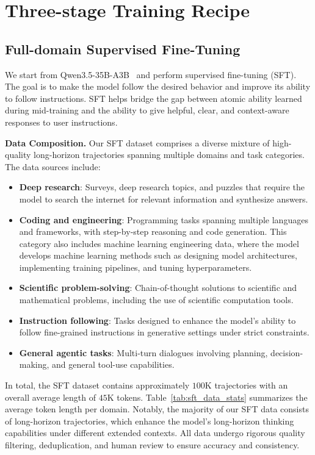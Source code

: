 \section{Three-stage Training Recipe}

\subsection{Full-domain Supervised Fine-Tuning}
\label{sec:sft}

We start from Qwen3.5-35B-A3B~\citep{Qwen3.5} and perform supervised fine-tuning (SFT). The goal is to make the model follow the desired behavior and improve its ability to follow instructions. SFT helps bridge the gap between atomic ability learned during mid-training and the ability to give helpful, clear, and context-aware responses to user instructions.


\textbf{Data Composition.}
Our SFT dataset comprises a diverse mixture of high-quality long-horizon trajectories spanning multiple domains and task categories. The data sources include:
\begin{itemize}
    \item \textbf{Deep research}: Surveys, deep research topics, and puzzles that require the model to search the internet for relevant information and synthesize answers.
    \item \textbf{Coding and engineering}: Programming tasks spanning multiple languages and frameworks, with step-by-step reasoning and code generation. This category also includes machine learning engineering data, where the model develops machine learning methods such as designing model architectures, implementing training pipelines, and tuning hyperparameters.
    \item \textbf{Scientific problem-solving}: Chain-of-thought solutions to scientific and mathematical problems, including the use of scientific computation tools.
    \item \textbf{Instruction following}: Tasks designed to enhance the model's ability to follow fine-grained instructions in generative settings under strict constraints.
    \item \textbf{General agentic tasks}: Multi-turn dialogues involving planning, decision-making, and general tool-use capabilities.
\end{itemize}

In total, the SFT dataset contains approximately $100$K trajectories with an overall average length of $45$K tokens. Table~\ref{tab:sft_data_stats} summarizes the average token length per domain. Notably, the majority of our SFT data consists of long-horizon trajectories, which enhance the model's long-horizon thinking capabilities under different extended contexts. All data undergo rigorous quality filtering, deduplication, and human review to ensure accuracy and consistency.

